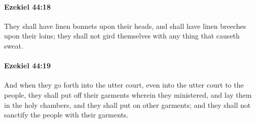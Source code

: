 		\paragraph{Ezekiel 44:18} %
			\label{EZEKIEL-44-18}

			They shall have linen bonnets upon their heads, and shall have linen breeches upon their loins; they shall not gird themselves with any thing that causeth sweat.


		\paragraph{Ezekiel 44:19} %
			\label{EZEKIEL-44-19}

			And when they go forth into the utter court, even into the utter court to the people, they shall put off their garments wherein they ministered, and lay them in the holy chambers, and they shall put on other garments; and they shall not sanctify the people with their garments.

